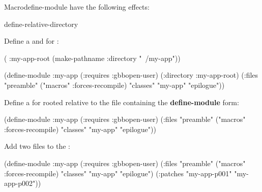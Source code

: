 \documentclass[10pt,twoside,english,pdftex]{article}
\begin{document}
\begin{functiondoc}{Macro}{define-module}{\superstar}
 have the following effects: 
%
\W\supp\tabletop
\compilemodulefileoptions

\begin{alsos}{define-relative-directory}
\also[patch]
\end{alsos}

\fnexamples
{}%
Define a  and  for :
%
\W\supp
\begin{example}
  ( :my-app-root 
    (make-pathname :directory "~/my-app"))

  (define-module :my-app
    (:requires :gbbopen-user)
    (:directory :my-app-root)
    (:files "preamble"
            ("macros" :forces-recompile)
            "classes"
            "my-app"
            "epilogue"))
\end{example}

Define a  for  rooted relative to the file 
containing the \textbf{define-module} form:
%
\W\supp
\begin{example}
  (define-module :my-app
    (:requires :gbbopen-user)
    (:files "preamble"
            ("macros" :forces-recompile)
            "classes"
            "my-app"
            "epilogue"))
\end{example}

Add two  files to the  :
%
\W\supp
\begin{example}
  (define-module :my-app
    (:requires :gbbopen-user)
    (:files "preamble"
            ("macros" :forces-recompile)
            "classes"
            "my-app"
            "epilogue")
    (:patches "my-app-p001"
              "my-app-p002"))
\end{example}

\end{functiondoc}

\end{document}
